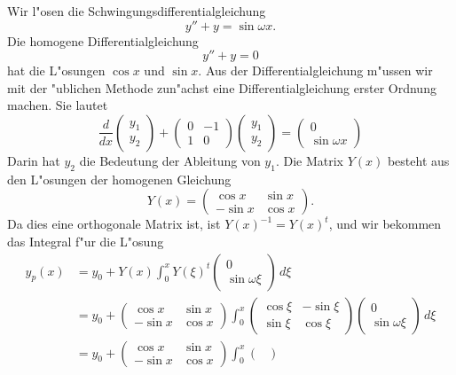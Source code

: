 \begin{beispiel}
Wir l"osen die Schwingungsdifferentialgleichung 
\[
y''+y=\sin\omega x.
\]
Die homogene Differentialgleichung 
\[
y''+y=0
\]
hat die L"osungen $\cos x$ und $\sin x$.
Aus der Differentialgleichung m"ussen wir mit der "ublichen Methode
zun"achst eine Differentialgleichung erster Ordnung machen.
Sie lautet
\[
\frac{d}{dx}\begin{pmatrix}y_1\\y_2\end{pmatrix}
+
\begin{pmatrix}
 0&-1\\
 1& 0
\end{pmatrix}
\begin{pmatrix}
y_1\\y_2
\end{pmatrix}
=
\begin{pmatrix}0\\\sin\omega x \end{pmatrix}
\]
Darin hat $y_2$ die Bedeutung der Ableitung von $y_1$.
Die Matrix $Y(x)$ besteht aus den L"osungen der homogenen
Gleichung
\[
Y(x)
=
\begin{pmatrix}
 \cos x& \sin x\\
-\sin x& \cos x
\end{pmatrix}.
\]
Da dies eine orthogonale Matrix ist, ist $Y(x)^{-1}=Y(x)^t$,
und wir bekommen das Integral f"ur die L"osung
\begin{align*}
y_p(x)
&=
y_0+Y(x)\int_0^x Y(\xi)^t
\begin{pmatrix}0\\\sin\omega\xi\end{pmatrix}
\,d\xi
\\
&=
y_0
+
\begin{pmatrix}
 \cos x& \sin x\\
-\sin x& \cos x
\end{pmatrix}
\int_0^x
\begin{pmatrix}
 \cos \xi&-\sin \xi\\
 \sin \xi& \cos \xi
\end{pmatrix}
\begin{pmatrix}0\\\sin\omega\xi\end{pmatrix}
\,d\xi
\\
&=
y_0
+
\begin{pmatrix}
 \cos x& \sin x\\
-\sin x& \cos x
\end{pmatrix}
\int_0^x
\begin{pmatrix}

\end{pmatrix}
\end{align*}
\end{beispiel}
